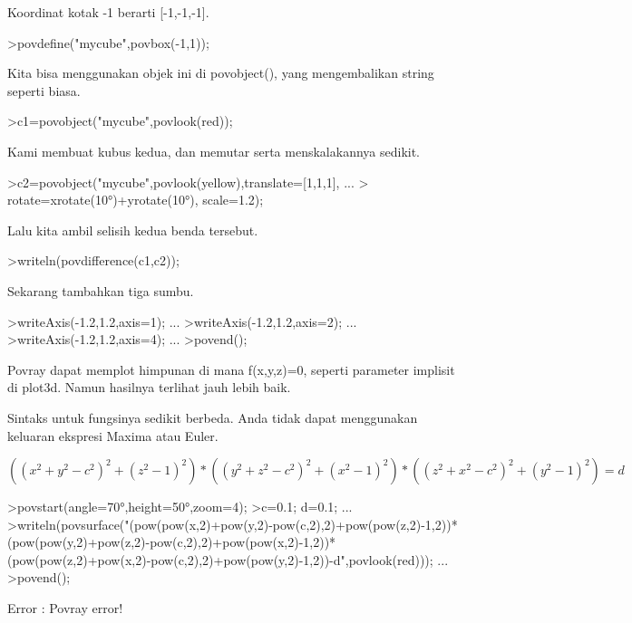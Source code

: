 \documentclass[a4paper,10pt]{article}
\begin{document}
\begin{eulernotebook}
\begin{eulercomment}
\begin{eulercomment}
\begin{eulercomment}
Koordinat kotak -1 berarti [-1,-1,-1].
\end{eulercomment}
\begin{eulerprompt}
>povdefine("mycube",povbox(-1,1));
\end{eulerprompt}
\begin{eulercomment}
Kita bisa menggunakan objek ini di povobject(), yang mengembalikan
string seperti biasa.
\end{eulercomment}
\begin{eulerprompt}
>c1=povobject("mycube",povlook(red));
\end{eulerprompt}
\begin{eulercomment}
Kami membuat kubus kedua, dan memutar serta menskalakannya sedikit.
\end{eulercomment}
\begin{eulerprompt}
>c2=povobject("mycube",povlook(yellow),translate=[1,1,1], ...
>  rotate=xrotate(10°)+yrotate(10°), scale=1.2);
\end{eulerprompt}
\begin{eulercomment}
Lalu kita ambil selisih kedua benda tersebut.
\end{eulercomment}
\begin{eulerprompt}
>writeln(povdifference(c1,c2));
\end{eulerprompt}
\begin{eulercomment}
Sekarang tambahkan tiga sumbu.
\end{eulercomment}
\begin{eulerprompt}
>writeAxis(-1.2,1.2,axis=1); ...
>writeAxis(-1.2,1.2,axis=2); ...
>writeAxis(-1.2,1.2,axis=4); ...
>povend();
\end{eulerprompt}
\begin{eulercomment}
Povray dapat memplot himpunan di mana f(x,y,z)=0, seperti parameter
implisit di plot3d. Namun hasilnya terlihat jauh lebih baik.

Sintaks untuk fungsinya sedikit berbeda. Anda tidak dapat menggunakan
keluaran ekspresi Maxima atau Euler.

\end{eulercomment}
\begin{eulerformula}
\[
((x^2+y^2-c^2)^2+(z^2-1)^2)*((y^2+z^2-c^2)^2+(x^ 2-1)^2)*((z^2+x^2-c^2)^2+(y^2-1)^2)=d
\]
\end{eulerformula}
\begin{eulerprompt}
>povstart(angle=70°,height=50°,zoom=4);
>c=0.1; d=0.1; ...
>writeln(povsurface("(pow(pow(x,2)+pow(y,2)-pow(c,2),2)+pow(pow(z,2)-1,2))*(pow(pow(y,2)+pow(z,2)-pow(c,2),2)+pow(pow(x,2)-1,2))*(pow(pow(z,2)+pow(x,2)-pow(c,2),2)+pow(pow(y,2)-1,2))-d",povlook(red))); ...
>povend();
\end{eulerprompt}
\begin{euleroutput}
  Error : Povray error!
  

\end{euleroutput}
\end{eulercomment}
\end{eulercomment}
\end{eulernotebook}
\end{document}
